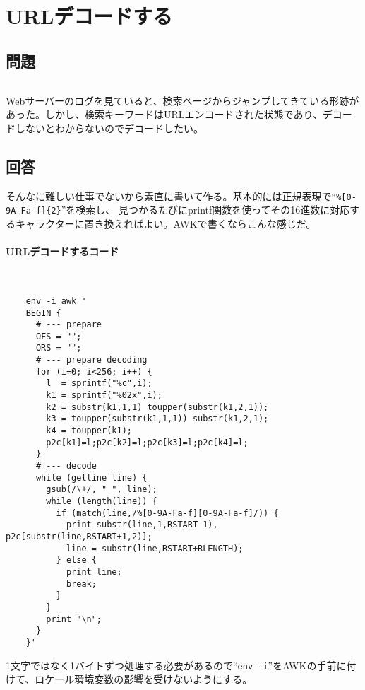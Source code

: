 \section{URLデコードする}
\label{recipe:URL_decode}

\subsection*{問題}
\noindent
$\!\!\!\!\!$
\begin{grshfboxit}{160.0mm}
	Webサーバーのログを見ていると、検索ページからジャンプしてきている形跡があった。しかし、検索キーワードはURLエンコードされた状態であり、デコードしないとわからないのでデコードしたい。
\end{grshfboxit}

\subsection*{回答}
そんなに難しい仕事でないから素直に書いて作る。基本的には正規表現で``\verb|%[0-9A-Fa-f]{2}|''を検索し、
見つかるたびにprintf関数を使ってその16進数に対応するキャラクターに置き換えればよい。AWKで書くならこんな感じだ。

\paragraph{URLデコードするコード} 　\\
\begin{frameboxit}{160.0mm}
\begin{verbatim}
	env -i awk '
	BEGIN {
	  # --- prepare
	  OFS = "";
	  ORS = "";
	  # --- prepare decoding
	  for (i=0; i<256; i++) {
	    l  = sprintf("%c",i);
	    k1 = sprintf("%02x",i);
	    k2 = substr(k1,1,1) toupper(substr(k1,2,1));
	    k3 = toupper(substr(k1,1,1)) substr(k1,2,1);
	    k4 = toupper(k1);
	    p2c[k1]=l;p2c[k2]=l;p2c[k3]=l;p2c[k4]=l;
	  }
	  # --- decode
	  while (getline line) {
	    gsub(/\+/, " ", line);
	    while (length(line)) {
	      if (match(line,/%[0-9A-Fa-f][0-9A-Fa-f]/)) {
	        print substr(line,1,RSTART-1), p2c[substr(line,RSTART+1,2)];
	        line = substr(line,RSTART+RLENGTH);
	      } else {
	        print line;
	        break;
	      }
	    }
	    print "\n";
	  }
	}'
\end{verbatim}
\end{frameboxit}

1文字ではなく1バイトずつ処理する必要があるので``\verb|env -i|''をAWKの手前に付けて、ロケール環境変数の影響を受けないようにする。

